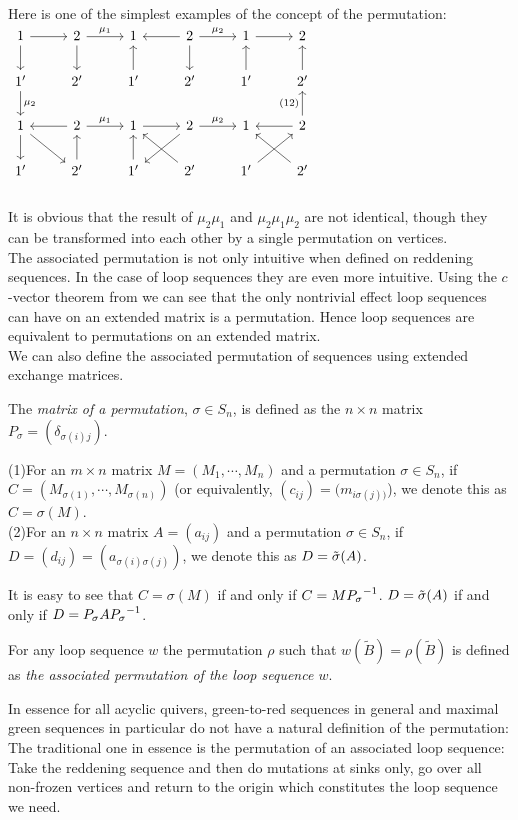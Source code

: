 \indent Here is one of the simplest examples of the concept of the permutation:\\
$\begin{tikzcd}
1 \arrow[r] \arrow[d] & 2\arrow [d]\arrow[r,"\mu_1"]  & 1&2\arrow[l]\arrow[d]\arrow[r,"\mu_2"]&1\arrow[r] & 2\\
1' \arrow[d,"\mu_2"]& 2'&1'\arrow[u]& 2'&1'\arrow[u] & 2'\arrow[u]\\
 1\arrow[d]\arrow[dr]&2\arrow[l]\arrow[r,"\mu_1"]&1\arrow[r]&2\arrow[dl]\arrow[r,"\mu_2"]&1&2\arrow[l]\arrow[u,"(12)"]\\
 1'&2'\arrow[u]&1'\arrow[u]&2'\arrow[ul]&1'\arrow[ur]&2'\arrow[ul]\\
\end{tikzcd}$\\
\indent It is obvious that the result of $\mu_2\mu_1$ and $\mu_2\mu_1\mu_2$ are not identical, though they can be transformed into each other by a single permutation on vertices.\\
\indent The associated permutation is not only intuitive when defined on reddening sequences. In the case of loop sequences they are even more intuitive. Using the $c$-vector theorem from \cite{ST12} we can see that the only nontrivial effect loop sequences can have on an extended matrix is a permutation. Hence loop sequences are equivalent to permutations on an extended matrix.\\
\indent We can also define the associated permutation of sequences using extended exchange matrices.\\
\begin{definition}
The \textit{matrix of a permutation}, $\sigma\in S_n$, is defined as the $n\times n$ matrix $P_\sigma=(\delta_{\sigma(i)j})$.\\
\end{definition}
\begin{definition}
(1)For an $m\times n$ matrix $M=(M_1,\cdots, M_n)$ and a permutation $\sigma\in S_n$, if $C=(M_{\sigma(1)},\cdots,M_{\sigma(n)})$ (or equivalently, $(c_{ij})=(m_{i\sigma(j))}$), we denote this as $C=\sigma(M)$.\\
(2)For an $n\times n$ matrix $A=(a_{ij})$ and a permutation $\sigma\in S_n$, if $D=(d_{ij})=(a_{\sigma(i)\sigma(j)})$, we denote this as $D=\tilde{\sigma}(A)$.\\
\end{definition}
\indent It is easy to see that $C=\sigma(M)$ if and only if $C=M{P_{\sigma}}^{-1}$. $D=\tilde{\sigma}(A)$ if and only if $D=P_{\sigma} A{P_{\sigma}}^{-1}$.\\
\begin{definition}
For any loop sequence $w$ the permutation $\rho$ such that $w(\tilde{B})=\rho(\tilde{B})$ is defined as \textit{the associated permutation of the loop sequence $w$}.\\
\end{definition}
\indent In essence for all acyclic quivers, green-to-red sequences in general and maximal green sequences in particular do not have a natural definition of the permutation: The traditional one in essence is the permutation of an associated loop sequence: Take the reddening sequence and then do mutations at sinks only, go over all non-frozen vertices and return to the origin which constitutes the loop sequence we need.\\
